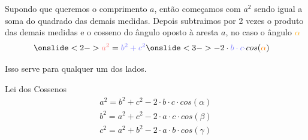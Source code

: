 \documentclass[handout]{beamer}
\begin{document}
\begin{frame}[fragile]\frametitle{\secname}
    \begin{figure}[H]
        \centering
    \end{figure}
    Supondo que queremos o comprimento \textcolor{red!50}{$a$},  então começamos com $a^2$ sendo igual a
    soma do quadrado das demais medidas.  Depois subtraimos por 2 vezes
    o produto das demais medidas e o cosseno do ângulo oposto à aresta \textcolor{red!50}{$a$}, no caso 
    o ângulo \textcolor{orange}{$\alpha$}
    \begin{align*}
        \onslide<2-> \textcolor{red!50}{a^2} &= \textcolor{blue!50}{b^2 + c^2} \onslide<3-> 
        - 2\cdot \textcolor{blue!50}{b\cdot c\cdot} cos(\textcolor{orange}{\alpha})
    \end{align*}
    \begin{alertblock}{}
        Isso serve para qualquer um dos lados.
    \end{alertblock}

    
\end{frame}


\begin{frame}%
    \begin{block}{Lei dos Cossenos}
        \begin{align*}
            a^2 = b^2 + c^2 - 2\cdot b\cdot c\cdot cos(\alpha)\\
            b^2 = a^2 + c^2 - 2\cdot a\cdot c\cdot cos(\beta)\\ 
            c^2 = a^2 + b^2 - 2\cdot a\cdot b\cdot cos(\gamma)   
        \end{align*}
    \end{block}
\end{frame}
\end{document}
